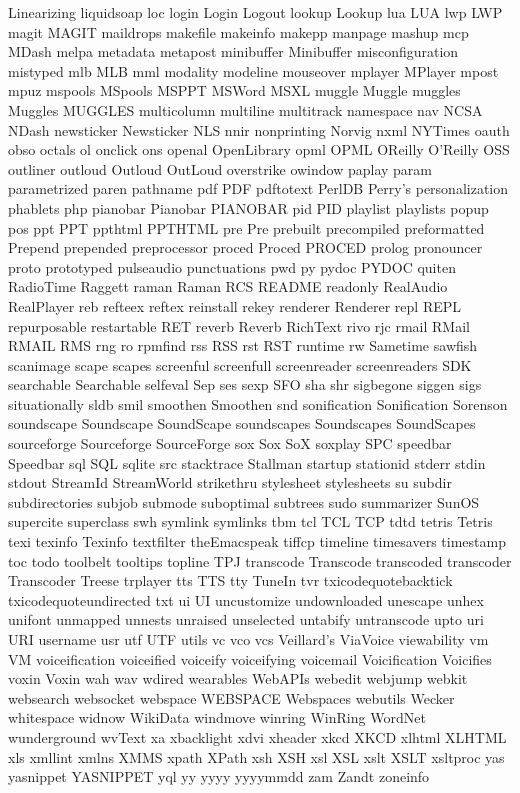 Linearizing
liquidsoap
loc
login
Login
Logout
lookup
Lookup
lua
LUA
lwp
LWP
magit
MAGIT
maildrops
makefile
makeinfo
makepp
manpage
mashup
mcp
MDash
melpa
metadata
metapost
minibuffer
Minibuffer
misconfiguration
mistyped
mlb
MLB
mml
modality
modeline
mouseover
mplayer
MPlayer
mpost
mpuz
mspools
MSpools
MSPPT
MSWord
MSXL
muggle
Muggle
muggles
Muggles
MUGGLES
multicolumn
multiline
multitrack
namespace
nav
NCSA
NDash
newsticker
Newsticker
NLS
nnir
nonprinting
Norvig
nxml
NYTimes
oauth
obso
octals
ol
onclick
ons
openal
OpenLibrary
opml
OPML
OReilly
O'Reilly
OSS
outliner
outloud
Outloud
OutLoud
overstrike
owindow
paplay
param
parametrized
paren
pathname
pdf
PDF
pdftotext
PerlDB
Perry's
personalization
phablets
php
pianobar
Pianobar
PIANOBAR
pid
PID
playlist
playlists
popup
pos
ppt
PPT
ppthtml
PPTHTML
pre
Pre
prebuilt
precompiled
preformatted
Prepend
prepended
preprocessor
proced
Proced
PROCED
prolog
pronouncer
proto
prototyped
pulseaudio
punctuations
pwd
py
pydoc
PYDOC
quiten
RadioTime
Raggett
raman
Raman
RCS
README
readonly
RealAudio
RealPlayer
reb
refteex
reftex
reinstall
rekey
renderer
Renderer
repl
REPL
repurposable
restartable
RET
reverb
Reverb
RichText
rivo
rjc
rmail
RMail
RMAIL
RMS
rng
ro
rpmfind
rss
RSS
rst
RST
runtime
rw
Sametime
sawfish
scanimage
scape
scapes
screenful
screenfull
screenreader
screenreaders
SDK
searchable
Searchable
selfeval
Sep
ses
sexp
SFO
sha
shr
sigbegone
siggen
sigs
situationally
sldb
smil
smoothen
Smoothen
snd
sonification
Sonification
Sorenson
soundscape
Soundscape
SoundScape
soundscapes
Soundscapes
SoundScapes
sourceforge
Sourceforge
SourceForge
sox
Sox
SoX
soxplay
SPC
speedbar
Speedbar
sql
SQL
sqlite
src
stacktrace
Stallman
startup
stationid
stderr
stdin
stdout
StreamId
StreamWorld
strikethru
stylesheet
stylesheets
su
subdir
subdirectories
subjob
submode
suboptimal
subtrees
sudo
summarizer
SunOS
supercite
superclass
swh
symlink
symlinks
tbm
tcl
TCL
TCP
tdtd
tetris
Tetris
texi
texinfo
Texinfo
textfilter
theEmacspeak
tiffcp
timeline
timesavers
timestamp
toc
todo
toolbelt
tooltips
topline
TPJ
transcode
Transcode
transcoded
transcoder
Transcoder
Treese
trplayer
tts
TTS
tty
TuneIn
tvr
txicodequotebacktick
txicodequoteundirected
txt
ui
UI
uncustomize
undownloaded
unescape
unhex
unifont
unmapped
unnests
unraised
unselected
untabify
untranscode
upto
uri
URI
username
usr
utf
UTF
utils
vc
vco
vcs
Veillard's
ViaVoice
viewability
vm
VM
voiceification
voiceified
voiceify
voiceifying
voicemail
Voicification
Voicifies
voxin
Voxin
wah
wav
wdired
wearables
WebAPIs
webedit
webjump
webkit
websearch
websocket
webspace
WEBSPACE
Webspaces
webutils
Wecker
whitespace
widnow
WikiData
windmove
winring
WinRing
WordNet
wunderground
wvText
xa
xbacklight
xdvi
xheader
xkcd
XKCD
xlhtml
XLHTML
xls
xmllint
xmlns
XMMS
xpath
XPath
xsh
XSH
xsl
XSL
xslt
XSLT
xsltproc
yas
yasnippet
YASNIPPET
yql
yy
yyyy
yyyymmdd
zam
Zandt
zoneinfo
